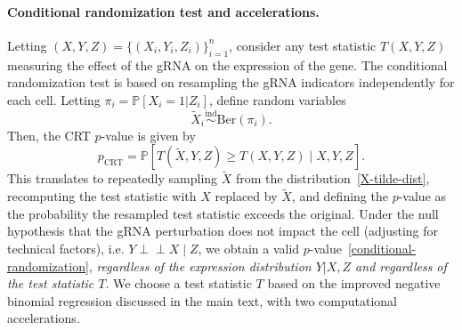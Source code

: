 \documentclass{nature}
\newcommand\independent{\perp \!\!\! \perp}
\begin{document}
\paragraph{Conditional randomization test and accelerations.}

Letting $(X, Y, Z) = \{(X_i, Y_i, Z_i)\}_{i = 1}^{n}$, consider any test statistic $T(X,Y,Z)$ measuring the effect of the gRNA on the expression of the gene. The conditional randomization test\cite{CetL16} is based on resampling the gRNA indicators independently for each cell. Letting $\pi_i = \mathbb P[X_i = 1 | Z_i]$, define random variables
\begin{equation}
\widetilde X_i \overset{\text{ind}}\sim \text{Ber}(\pi_i). 
\label{X-tilde-dist}
\end{equation}
Then, the CRT $p$-value is given by
\begin{equation}
p_{\text{CRT}} = \mathbb P[T(\widetilde X, Y, Z) \geq T(X,Y,Z)\mid X,Y,Z].
\label{conditional-randomization}
\end{equation}
This translates to repeatedly sampling $\widetilde X$ from the distribution~\eqref{X-tilde-dist}, recomputing the test statistic with $X$ replaced by $\widetilde X$, and defining the $p$-value as the probability the resampled test statistic exceeds the original. Under the null hypothesis that the gRNA perturbation does not impact the cell (adjusting for technical factors), i.e. $Y \independent X \mid Z$, we obtain a valid $p$-value~\eqref{conditional-randomization}, \textit{regardless of the expression distribution $Y|X,Z$ and regardless of the test statistic $T$}. We choose a test statistic $T$ based on the improved negative binomial regression discussed in the main text, with two computational accelerations.
\end{document}
